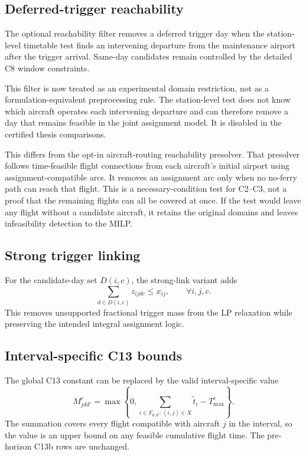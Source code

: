 \subsection{Deferred-trigger reachability}

The optional reachability filter removes a deferred trigger day when the
station-level timetable test finds an intervening departure from the
maintenance airport after the trigger arrival. Same-day candidates remain
controlled by the detailed C8 window constraints.

This filter is now treated as an experimental domain restriction, not as a
formulation-equivalent preprocessing rule. The station-level test does not know
which aircraft operates each intervening departure and can therefore remove a
day that remains feasible in the joint assignment model. It is disabled in the
certified thesis comparisons.

This differs from the opt-in aircraft-routing reachability presolver. That
presolver follows time-feasible flight connections from each aircraft's initial
airport using assignment-compatible arcs. It removes an assignment arc only
when no no-ferry path can reach that flight. This is a necessary-condition test
for C2--C3, not a proof that the remaining flights can all be covered at once.
If the test would leave any flight without a candidate aircraft, it retains the
original domains and leaves infeasibility detection to the MILP.

\subsection{Strong trigger linking}

For the candidate-day set $D(i,c)$, the strong-link variant adds
\begin{equation}
    \sum_{d\in D(i,c)} z_{ijdc} \leq x_{ij},
    \qquad \forall i,j,c.
    \label{eq:strength_strong_link}
\end{equation}
This removes unsupported fractional trigger mass from the LP relaxation while
preserving the intended integral assignment logic.

\subsection{Interval-specific C13 bounds}

The global C13 constant can be replaced by the valid interval-specific value
\begin{equation}
    M_{jdd'}^c = \max\left\{0,
    \sum_{i\in F_{d,d'}:(i,j)\in X}\tilde{t}_i - T_{\max}^c\right\}.
    \label{eq:strength_tight_m}
\end{equation}
The summation covers every flight compatible with aircraft $j$ in the interval,
so the value is an upper bound on any feasible cumulative flight time. The
pre-horizon C13b rows are unchanged.

